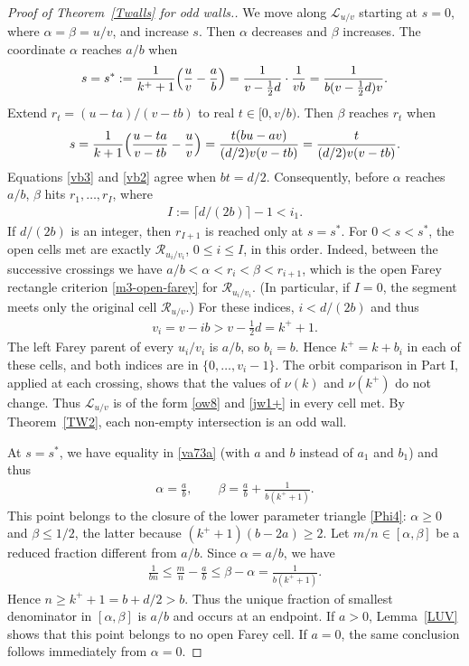 \documentclass[11pt,reqno,tbtags,a4paper]{amsart}
\numberwithin{equation}{section}
\renewcommand\le{\leq}
\renewcommand\ge{\geq}
\renewcommand\leq{\leqslant}
\renewcommand\geq{\geqslant}
\theoremstyle{plain}%
\theoremstyle{definition}
\theoremstyle{remark}
\newcommand{\refT}[1]{Theorem~\ref{#1}}
\newcommand{\refL}[1]{Lemma~\ref{#1}}
\newcommand\set[1]{\ensuremath{\{#1\}}}
\newcommand\Bigpar[1]{\Bigl(#1\Bigr)}
\newcommand\ceil[1]{\lceil#1\rceil}
\newcounter{cc}
\newcommand\ga{\alpha}
\newcommand\gb{\beta}
\newcommand\LL{{\mathcal L}}
\newcommand\cR{{\mathcal R}}
\newcommand\uv{_{u/v}}
\newcommand\uvx[1]{_{u_{#1}/v_{#1}}}
\newcommand\kx{{k^+}}
\newcommand\sx{s^*}
\newcommand\0{{\boldsymbol 0}}
\newcommand\1{{\boldsymbol 1}}
\begin{document}
\begin{proof}[Proof of \refT{Twalls} for odd walls.]
We move along $\LL\uv$ starting at $s=0$, where $\ga=\gb=u/v$, and
increase $s$. Then $\ga$ decreases and $\gb$ increases.
The coordinate $\ga$ reaches $a/b$ when
\begin{align}\label{vb2}
 s=\sx:=\frac{1}{\kx+1}\Bigpar{\frac{u}v-\frac{a}b}
 =\frac{1}{v-\frac12d}\cdot\frac{1}{vb}
 =\frac{1}{b(v-\frac12d)v}.
\end{align}
Extend $r_t=(u-ta)/(v-tb)$ to real $t\in[0,v/b)$.
Then $\gb$ reaches $r_t$ when
\begin{align}\label{vb3}
 s=\frac{1}{k+1}\Bigpar{\frac{u-ta}{v-tb}-\frac{u}{v}}
 =\frac{t(bu-av)}{(d/2)v(v-tb)}
 =\frac{t}{(d/2)v(v-tb)}.
\end{align}
Equations \eqref{vb3} and \eqref{vb2} agree when $bt=d/2$.
Consequently, before $\ga$ reaches $a/b$, $\gb$ hits
$r_1,\dots,r_I$, where
\begin{align}\label{vbT}
 I:=\ceil{d/(2b)}-1
< i_1
.\end{align}
If $d/(2b)$ is an integer, then  $r_{I+1}$ is reached only at $s=\sx$.
For $0<s<\sx$, the open cells met are exactly
$\cR\uvx i$, $0\le i\le I$, in this order.
Indeed, between the successive crossings we have
$a/b<\ga<r_i<\gb<r_{i+1}$, which is the open Farey rectangle criterion
\eqref{m3-open-farey} for $\cR\uvx i$.
(In particular, if $I=0$, the segment meets only the original cell
$\cR\uv$.)
For these indices,
$i<d/(2b)$ and thus
\begin{align}\label{vb4}
%
 v_i=v-ib>v-\tfrac12d=\kx+1.
\end{align}
The left Farey parent of every $u_i/v_i$ is $a/b$, so $b_i=b$.
Hence $\kx=k+b_i$ in each of these cells, and both indices are in
$\set{0,\dots,v_i-1}$.
The orbit comparison in Part I, applied at each crossing, shows that
the values of $\nu(k)$ and $\nu(\kx)$ do not change.
Thus %
$\LL\uv$
is of the form \eqref{ow8} and \eqref{jw1+} in every cell met.
By \refT{TW2}, each non-empty intersection is an odd wall.

At $s=\sx$, we have
equality in \eqref{va73a} (with $a$ and $b$ instead of $a_1$ and $b_1$)
and thus
\begin{align}\label{vb-end-ab}
 \ga=\frac ab,\qquad
 \gb=\frac ab+\frac{1}{b(\kx+1)}.
\end{align}
This point belongs to the closure of the lower parameter triangle
\eqref{Phi4}:
$\ga\ge0$ and $\gb\le1/2$, the latter because
$(\kx+1)(b-2a)\ge2$.
Let $m/n\in[\ga,\gb]$ be a reduced fraction different from $a/b$.
Since $\ga=a/b$, we have
\begin{align*}
 \frac{1}{bn}
 \le \frac{m}{n}-\frac{a}{b}
 \le \gb-\ga
 =\frac{1}{b(\kx+1)}.
\end{align*}
Hence $n\ge\kx+1=b+d/2>b$.
Thus the unique fraction of smallest denominator in $[\ga,\gb]$ is $a/b$
and occurs at an endpoint.
If $a>0$, \refL{LUV} shows that this point belongs to no open Farey cell.
%
If $a=0$, the same conclusion follows immediately from $\ga=0$.
 

\end{proof}
\end{document}
